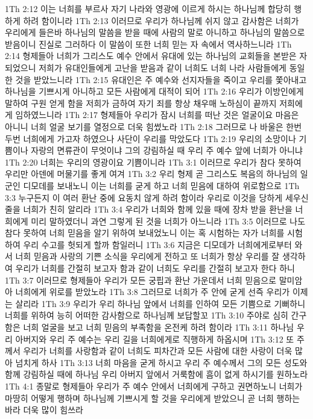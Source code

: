 1Th 2:12  이는 너희를 부르사 자기 나라와 영광에 이르게 하시는 하나님께 합당히 행하게 하려 함이니라
1Th 2:13  이러므로 우리가 하나님께 쉬지 않고 감사함은 너희가 우리에게 들은바 하나님의 말씀을 받을 때에 사람의 말로 아니하고 하나님의 말씀으로 받음이니 진실로 그러하다 이 말씀이 또한 너희 믿는 자 속에서 역사하느니라
1Th 2:14  형제들아 너희가 그리스도 예수 안에서 유대에 있는 하나님의 교회들을 본받은 자 되었으니 저희가 유대인들에게 고난을 받음과 같이 너희도 너희 나라 사람들에게 동일한 것을 받았느니라
1Th 2:15  유대인은 주 예수와 선지자들을 죽이고 우리를 쫓아내고 하나님을 기쁘시게 아니하고 모든 사람에게 대적이 되어
1Th 2:16  우리가 이방인에게 말하여 구원 얻게 함을 저희가 금하여 자기 죄를 항상 채우매 노하심이 끝까지 저희에게 임하였느니라
1Th 2:17  형제들아 우리가 잠시 너희를 떠난 것은 얼굴이요 마음은 아니니 너희 얼굴 보기를 열정으로 더욱 힘썼노라
1Th 2:18  그러므로 나 바울은 한번 두번 너희에게 가고자 하였으나 사단이 우리를 막았도다
1Th 2:19  우리의 소망이나 기쁨이나 자랑의 면류관이 무엇이냐 그의 강림하실 때 우리 주 예수 앞에 너희가 아니냐
1Th 2:20  너희는 우리의 영광이요 기쁨이니라
1Th 3:1  이러므로 우리가 참다 못하여 우리만 아덴에 머물기를 좋게 여겨
1Th 3:2  우리 형제 곧 그리스도 복음의 하나님의 일군인 디모데를 보내노니 이는 너희를 굳게 하고 너희 믿음에 대하여 위로함으로
1Th 3:3  누구든지 이 여러 환난 중에 요동치 않게 하려 함이라 우리로 이것을 당하게 세우신 줄을 너희가 친히 알리라
1Th 3:4  우리가 너희와 함께 있을 때에 장차 받을 환난을 너희에게 미리 말하였더니 과연 그렇게 된 것을 너희가 아느니라
1Th 3:5  이러므로 나도 참다 못하여 너희 믿음을 알기 위하여 보내었노니 이는 혹 시험하는 자가 너희를 시험하여 우리 수고를 헛되게 할까 함일러니
1Th 3:6  지금은 디모데가 너희에게로부터 와서 너희 믿음과 사랑의 기쁜 소식을 우리에게 전하고 또 너희가 항상 우리를 잘 생각하여 우리가 너희를 간절히 보고자 함과 같이 너희도 우리를 간절히 보고자 한다 하니
1Th 3:7  이러므로 형제들아 우리가 모든 궁핍과 환난 가운데서 너희 믿음으로 말미암아 너희에게 위로를 받았노라
1Th 3:8  그러므로 너희가 주 안에 굳게 선즉 우리가 이제는 살리라
1Th 3:9  우리가 우리 하나님 앞에서 너희를 인하여 모든 기쁨으로 기뻐하니 너희를 위하여 능히 어떠한 감사함으로 하나님께 보답할꼬
1Th 3:10  주야로 심히 간구함은 너희 얼굴을 보고 너희 믿음의 부족함을 온전케 하려 함이라
1Th 3:11  하나님 우리 아버지와 우리 주 예수는 우리 길을 너희에게로 직행하게 하옵시며
1Th 3:12  또 주께서 우리가 너희를 사랑함과 같이 너희도 피차간과 모든 사람에 대한 사랑이 더욱 많아 넘치게 하사
1Th 3:13  너희 마음을 굳게 하시고 우리 주 예수께서 그의 모든 성도와 함께 강림하실 때에 하나님 우리 아버지 앞에서 거룩함에 흠이 없게 하시기를 원하노라
1Th 4:1  종말로 형제들아 우리가 주 예수 안에서 너희에게 구하고 권면하노니 너희가 마땅히 어떻게 행하며 하나님께 기쁘시게 할 것을 우리에게 받았으니 곧 너희 행하는 바라 더욱 많이 힘쓰라
